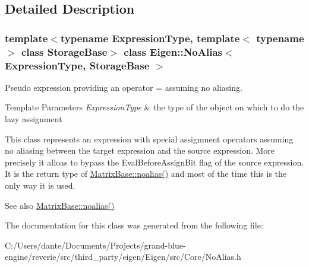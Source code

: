 \subsection{Detailed Description}
\subsubsection*{template$<$typename Expression\+Type, template$<$ typename $>$ class Storage\+Base$>$\newline
class Eigen\+::\+No\+Alias$<$ Expression\+Type, Storage\+Base $>$}

Pseudo expression providing an operator = assuming no aliasing. 


\begin{DoxyTemplParams}{Template Parameters}
{\em Expression\+Type} & the type of the object on which to do the lazy assignment\\
\hline
\end{DoxyTemplParams}
This class represents an expression with special assignment operators assuming no aliasing between the target expression and the source expression. More precisely it alloas to bypass the Eval\+Before\+Assign\+Bit flag of the source expression. It is the return type of \mbox{\hyperlink{class_eigen_1_1_matrix_base_a2c1085de7645f23f240876388457da0b}{Matrix\+Base\+::noalias()}} and most of the time this is the only way it is used.

\begin{DoxySeeAlso}{See also}
\mbox{\hyperlink{class_eigen_1_1_matrix_base_a2c1085de7645f23f240876388457da0b}{Matrix\+Base\+::noalias()}} 
\end{DoxySeeAlso}


The documentation for this class was generated from the following file\+:\begin{DoxyCompactItemize}
\item 
C\+:/\+Users/dante/\+Documents/\+Projects/grand-\/blue-\/engine/reverie/src/third\+\_\+party/eigen/\+Eigen/src/\+Core/No\+Alias.\+h\end{DoxyCompactItemize}
